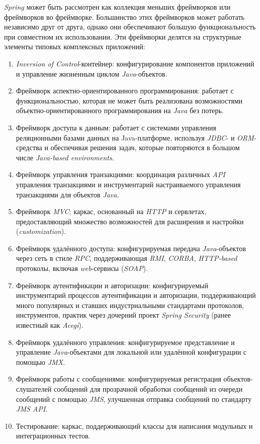 \textit{Spring} может быть рассмотрен как коллекция меньших фреймворков или фреймворков во фреймворке. Большинство этих фреймворков может работать независимо друг от друга, однако они обеспечивают большую функциональность при совместном их использовании. Эти фреймворки делятся на структурные элементы типовых комплексных приложений:

\begin{enumerate}
	\item \textit{Inversion of Control}-контейнер: конфигурирование компонентов приложений и управление жизненным циклом \textit{Java}-объектов.
	\item Фреймворк аспектно-ориентированного программирования: работает с функциональностью, которая не может быть реализована возможностями объектно-ориентированного программирования на \textit{Java} без потерь.
	\item Фреймворк доступа к данным: работает с системами управления реляционными базами данных на Java-платформе, используя \textit{JDBC}- и \textit{ORM}-средства и обеспечивая решения задач, которые повторяются в большом числе \textit{Java-based environments}.
	\item Фреймворк управления транзакциями: координация различных \textit{API} управления транзакциями и инструментарий настраиваемого управления транзакциями для объектов \textit{Java}.
	\item Фреймворк \textit{MVC}: каркас, основанный на \textit{HTTP} и сервлетах, предоставляющий множество возможностей для расширения и настройки (\textit{customization}).
	\item Фреймворк удалённого доступа: конфигурируемая передача \textit{Java}-объектов через сеть в стиле \textit{RPC}, поддерживающая \textit{RMI}, \textit{CORBA}, \textit{HTTP-based} протоколы, включая \textit{web}-сервисы (\textit{SOAP}).
	\item Фреймворк аутентификации и авторизации: конфигурируемый инструментарий процессов аутентификации и авторизации, поддерживающий много популярных и ставших индустриальными стандартами протоколов, инструментов, практик через дочерний проект \textit{Spring Security} (ранее известный как \textit{Acegi}).
	\item Фреймворк удалённого управления: конфигурируемое представление и управление \textit{Java}-объектами для локальной или удалённой конфигурации с помощью \textit{JMX}.
	\item Фреймворк работы с сообщениями: конфигурируемая регистрация объектов-слушателей сообщений для прозрачной обработки сообщений из очереди сообщений с помощью \textit{JMS}, улучшенная отправка сообщений по стандарту \textit{JMS API}.
	\item Тестирование: каркас, поддерживающий классы для написания модульных и интеграционных тестов.
\end{enumerate}

